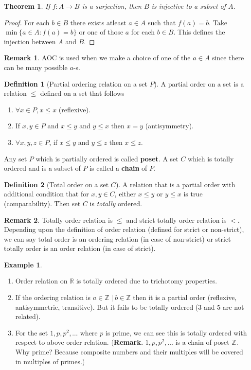 \documentclass[12pt]{report}
\newtheorem{thm}{Theorem}
\theoremstyle{definition}
\newtheorem{defn}{Definition}
\newtheorem*{rem}{Remark}
\newtheorem*{eg*}{Example}
\newcommand{\R}{\mathbb{R}}
\newcommand{\Z}{\mathbb{Z}}
\begin{document}
\begin{thm}
    If $f : A \to B$ is a surjection, then $B$ is injective to a subset of $A$. 
\end{thm}
\begin{proof}
    For each $b \in B$ there exists atleast $a \in A$ such that $f(a) = b$. Take $\min\{a \in A : f(a) = b\}$ or one of those $a$ for each $b \in B$. This defines the injection between $A$ and $B$.
\end{proof}
\begin{rem}
    AOC is used when we make a choice of one of the $a \in A$ since there can be many possible $a$-s.
\end{rem}
\begin{defn}[Partial ordering relation on a set $P$]
    A partial order on a set is a relation $\leq$ defined on a set that follows
    \begin{enumerate}
        \item $\forall x \in P, x \leq x$ (reflexive).
        \item If $x, y \in P$ and $x \leq y$ and $y \leq x$ then $x = y$ (antisymmetry).
        \item $\forall x, y, z \in P$, if $x \leq y$ and $y \leq z$ then $x \leq z$. 
    \end{enumerate}
    Any set $P$ which is partially ordered is called {\bf poset}. A set $C$ which is totally ordered and is a subset of $P$ is called a {\bf chain} of $P$.
\end{defn}
\begin{defn}[Total order on a set $C$]
    A relation that is a partial order with additional condition that for $x,y \in C$, either $x \leq y$ or $y \leq x$ is true (comparability). Then set $C$ is {\it totally} ordered.
\end{defn}
\begin{rem}
    Totally order relation is $\leq$ and strict totally order relation is $<$. Depending upon the definition of order relation (defined for strict or non-strict), we can say total order is an ordering relation (in case of non-strict) or strict totally order is an order relation (in case of strict).
\end{rem}
\begin{eg*}
\begin{enumerate}
    \item Order relation on $\R$ is totally ordered due to trichotomy properties.
    \item If the ordering relation is $a \in \Z \mid b \in \Z$ then it is a partial order (reflexive, antisymmetric, transitive). But it fails to be totally ordered ($3$ and $5$ are not related).
    \item For the set $1,p ,p^2, \dots$ where $p$ is prime, we can see this is totally ordered with respect to above order relation. ({\bf Remark.} $1, p, p^2, \dots$ is a chain of poset $\Z$. Why prime? Because composite numbers and their multiples will be covered in multiples of primes.)
\end{enumerate}
\end{eg*}
\end{document}
